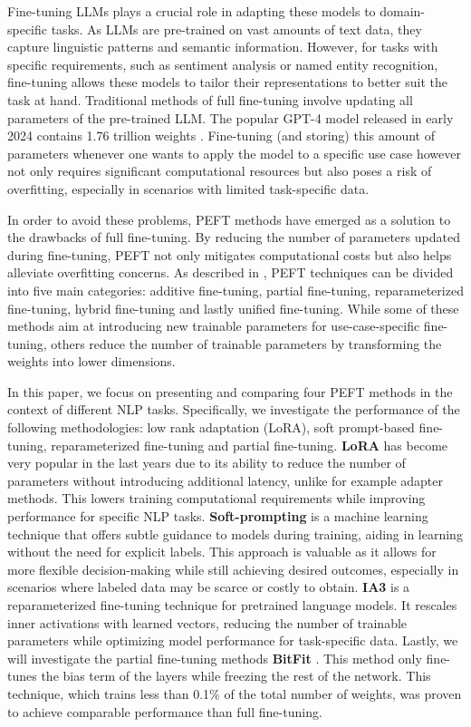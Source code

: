 Fine-tuning LLMs plays a crucial role in adapting these models to domain-specific tasks. As LLMs are pre-trained on vast amounts of text data, they capture linguistic patterns and semantic information. However, for tasks with specific requirements, such as sentiment analysis or named entity recognition, fine-tuning allows these models to tailor their representations to better suit the task at hand. Traditional methods of full fine-tuning involve updating all parameters of the pre-trained LLM. The popular GPT-4 model released in early 2024 contains 1.76 trillion weights \cite{openai2024gpt4}. Fine-tuning (and storing) this amount of parameters whenever one wants to apply the model to a specific use case however not only requires significant computational resources but also poses a risk of overfitting, especially in scenarios with limited task-specific data.

\noindent In order to avoid these problems, PEFT methods have emerged as a solution to the drawbacks of full fine-tuning. By reducing the number of parameters updated during fine-tuning, PEFT not only mitigates computational costs but also helps alleviate overfitting concerns. As described in \cite{xu2023parameterefficient}, PEFT techniques can be divided into five main categories: additive fine-tuning, partial fine-tuning, reparameterized fine-tuning, hybrid fine-tuning and lastly unified fine-tuning. While some of these methods aim at introducing new trainable parameters for use-case-specific fine-tuning, others reduce the number of trainable parameters by transforming the weights into lower dimensions.

In this paper, we focus on presenting and comparing four PEFT methods in the context of different NLP tasks. Specifically, we investigate the performance of the following methodologies: low rank adaptation (LoRA), soft prompt-based fine-tuning, reparameterized fine-tuning and partial fine-tuning. \textbf{LoRA} \cite{hu2021lora} has become very popular in the last years due to its ability to reduce the number of parameters without introducing additional latency, unlike for example adapter methods. This lowers training computational requirements while improving performance for specific NLP tasks. \textbf{Soft-prompting} \cite{lester2021power} is a machine learning technique that offers subtle guidance to models during training, aiding in learning without the need for explicit labels. This approach is valuable as it allows for more flexible decision-making while still achieving desired outcomes, especially in scenarios where labeled data may be scarce or costly to obtain. \textbf{IA3} \cite{liu2022fewshot} is a reparameterized fine-tuning technique for pretrained language models. It rescales inner activations with learned vectors, reducing the number of trainable parameters while optimizing model performance for task-specific data. Lastly, we will investigate the partial fine-tuning methods \textbf{BitFit} \cite{zaken2022bitfit}. This method only fine-tunes the bias term of the layers while freezing the rest of the network. This technique, which trains less than 0.1\% of the total number of weights, was proven to achieve comparable performance than full fine-tuning. 

